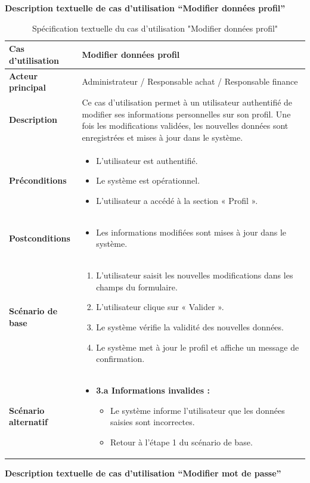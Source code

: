 \documentclass[a4paper,11pt]{report}
\begin{document}
\textbf{Description textuelle de cas d’utilisation “Modifier données profil”}

\begin{table}[H]
  \centering
  \renewcommand{\arraystretch}{1.5}
  \caption{Spécification textuelle du cas d'utilisation "Modifier données profil"}
  \begin{tabularx}{\textwidth}{|l|X|}
    \hline
    \textbf{Cas d'utilisation} & Modifier données profil \\ \hline
    \textbf{Acteur principal}   & Administrateur / Responsable achat / Responsable finance \\ \hline
    \textbf{Description}        & Ce cas d'utilisation permet à un utilisateur authentifié de modifier ses informations personnelles sur son profil. Une fois les modifications validées, les nouvelles données sont enregistrées et mises à jour dans le système. \\ \hline
    \textbf{Préconditions}      &
    \begin{itemize}[leftmargin=*]
      \item L’utilisateur est authentifié.
      \item Le système est opérationnel.
      \item L’utilisateur a accédé à la section « Profil ».
    \end{itemize} \\ \hline
    \textbf{Postconditions}     &
    \begin{itemize}[leftmargin=*]
      \item Les informations modifiées sont mises à jour dans le système.
    \end{itemize} \\ \hline
    \textbf{Scénario de base}   &
    \begin{enumerate}[leftmargin=*]
      \item L’utilisateur saisit les nouvelles modifications dans les champs du formulaire.
      \item L’utilisateur clique sur « Valider ».
      \item Le système vérifie la validité des nouvelles données.
      \item Le système met à jour le profil et affiche un message de confirmation.
    \end{enumerate} \\ \hline
    \textbf{Scénario alternatif} &
    \begin{itemize}[leftmargin=*]
      \item \textbf{3.a Informations invalides :}
        \begin{itemize}[leftmargin=1em]
          \item Le système informe l’utilisateur que les données saisies sont incorrectes.
          \item Retour à l’étape 1 du scénario de base.
        \end{itemize}
    \end{itemize} \\ \hline
  \end{tabularx}
\end{table}
\newpage
\textbf{Description textuelle de cas d’utilisation “Modifier mot de passe”}
\end{document}
